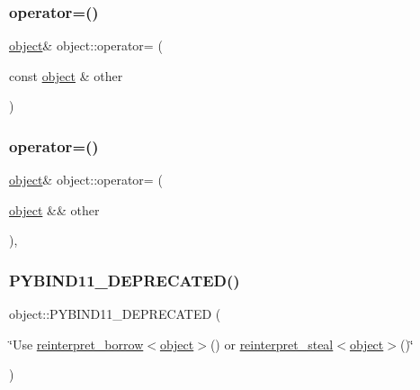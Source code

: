 \subsubsection{\texorpdfstring{operator=()}{operator=()}\hspace{0.1cm}{\footnotesize\ttfamily [1/2]}}
{\footnotesize\ttfamily \mbox{\hyperlink{classobject}{object}}\& object\+::operator= (\begin{DoxyParamCaption}\item[{const \mbox{\hyperlink{classobject}{object}} \&}]{other }\end{DoxyParamCaption})\hspace{0.3cm}{\ttfamily [inline]}}

\mbox{\label{classobject_a3f06d0eea159fe5bc18a96483a7438f2}} 
\subsubsection{\texorpdfstring{operator=()}{operator=()}\hspace{0.1cm}{\footnotesize\ttfamily [2/2]}}
{\footnotesize\ttfamily \mbox{\hyperlink{classobject}{object}}\& object\+::operator= (\begin{DoxyParamCaption}\item[{\mbox{\hyperlink{classobject}{object}} \&\&}]{other }\end{DoxyParamCaption})\hspace{0.3cm}{\ttfamily [inline]}, {\ttfamily [noexcept]}}

\mbox{\label{classobject_af2b49798a85dc52371995578108d84e1}} 
\subsubsection{\texorpdfstring{PYBIND11\_DEPRECATED()}{PYBIND11\_DEPRECATED()}}
{\footnotesize\ttfamily object\+::\+P\+Y\+B\+I\+N\+D11\+\_\+\+D\+E\+P\+R\+E\+C\+A\+T\+ED (\begin{DoxyParamCaption}\item[{\char`\"{}Use \mbox{\hyperlink{classobject_ac1ea1a4cbcf197d7c8096037633720d7}{reinterpret\+\_\+borrow}}$<$\mbox{\hyperlink{classobject}{object}}$>$() or \mbox{\hyperlink{classobject_ae1de2ab5a755c10582ac1e46071de5c5}{reinterpret\+\_\+steal}}$<$\mbox{\hyperlink{classobject}{object}}$>$()\char`\"{}}]{ }\end{DoxyParamCaption})}

